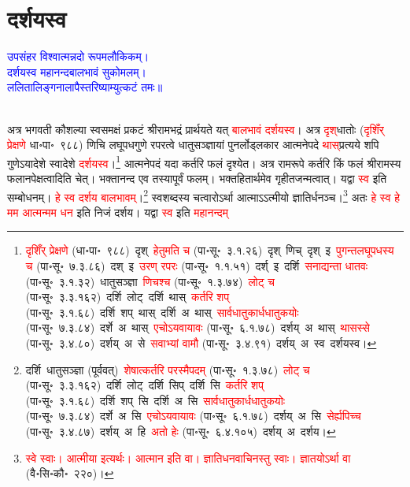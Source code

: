 \section[दर्शयस्व]{दर्शयस्व}
\centering\textcolor{blue}{उपसंहर विश्वात्मन्नदो रूपमलौकिकम्।\nopagebreak\\
दर्शयस्व महानन्दबालभावं सुकोमलम्।\nopagebreak\\
ललितालिङ्गनालापैस्तरिष्याम्युत्कटं तमः॥}\nopagebreak\\
\\
\fontsize{14}{21}\selectfont\begin{sloppypar}\justifying\noindent\hspace{10mm} अत्र भगवती कौशल्या स्व\-समक्षं प्रकटं श्रीराम\-भद्रं प्रार्थयते यत् \textcolor{red}{बाल\-भावं दर्शयस्व}। अत्र \textcolor{red}{दृश्‌}\-धातोः (\textcolor{red}{दृशिँर् प्रेक्षणे} धा॰पा॰~९८८) 
णिचि लघूपध\-गुणे रपरत्वे धातु\-सञ्ज्ञायां पुनर्लोड्लकार आत्मने\-पदे \textcolor{red}{थास्‌}\-प्रत्यये शपि गुणेऽयादेशे स्वादेशे \textcolor{red}{दर्शयस्व}।\footnote{\textcolor{red}{दृशिँर् प्रेक्षणे} (धा॰पा॰~९८८)~\arrow दृश्~\arrow \textcolor{red}{हेतुमति च} (पा॰सू॰~३.१.२६)~\arrow दृश्~णिच्~\arrow दृश्~इ~\arrow \textcolor{red}{पुगन्त\-लघूपधस्य च} (पा॰सू॰~७.३.८६)~\arrow दश्~इ~\arrow \textcolor{red}{उरण् रपरः} (पा॰सू॰~१.१.५१)~\arrow दर्श्~इ~\arrow दर्शि~\arrow \textcolor{red}{सनाद्यन्ता धातवः} (पा॰सू॰~३.१.३२)~\arrow धातुसञ्ज्ञा~\arrow \textcolor{red}{णिचश्च} (पा॰सू॰~१.३.७४)~\arrow \textcolor{red}{लोट् च} (पा॰सू॰~३.३.१६२)~\arrow दर्शि~लोट्~\arrow दर्शि~थास्~\arrow \textcolor{red}{कर्तरि शप्} (पा॰सू॰~३.१.६८)~\arrow दर्शि~शप्~थास्~\arrow दर्शि~अ~थास्~\arrow \textcolor{red}{सार्वधातुकार्धधातुकयोः} (पा॰सू॰~७.३.८४)~\arrow दर्शे~अ~थास्~\arrow \textcolor{red}{एचोऽयवायावः} (पा॰सू॰~६.१.७८)~\arrow दर्शय्~अ~थास्~\arrow \textcolor{red}{थासस्से} (पा॰सू॰~३.४.८०)~\arrow दर्शय्~अ~से~\arrow \textcolor{red}{सवाभ्यां वामौ} (पा॰सू॰~३.४.९१)~\arrow दर्शय्~अ~स्व~\arrow दर्शयस्व।} आत्मनेपदं यदा कर्तरि फलं दृश्येत। अत्र राम\-रूपे कर्तरि किं फलं श्रीरामस्य फलानपेक्षत्वादिति चेत्। भक्तानन्द एव तस्यापूर्वं फलम्। भक्त\-हितार्थमेव गृहीत\-जन्मत्वात्। यद्वा \textcolor{red}{स्व} इति सम्बोधनम्। \textcolor{red}{हे स्व दर्शय बाल\-भावम्}।\footnote{दर्शि~\arrow धातुसञ्ज्ञा (पूर्ववत्)~\arrow \textcolor{red}{शेषात्कर्तरि परस्मैपदम्} (पा॰सू॰~१.३.७८)~\arrow \textcolor{red}{लोट् च} (पा॰सू॰~३.३.१६२)~\arrow दर्शि~लोट्~\arrow दर्शि~सिप्~\arrow दर्शि~सि~\arrow \textcolor{red}{कर्तरि शप्} (पा॰सू॰~३.१.६८)~\arrow दर्शि~शप्~सि~\arrow दर्शि~अ~सि~\arrow \textcolor{red}{सार्वधातुकार्धधातुकयोः} (पा॰सू॰~७.३.८४)~\arrow दर्शे~अ~सि~\arrow \textcolor{red}{एचोऽयवायावः} (पा॰सू॰~६.१.७८)~\arrow दर्शय्~अ~सि~\arrow \textcolor{red}{सेर्ह्यपिच्च} (पा॰सू॰~३.४.८७)~\arrow दर्शय्~अ~हि~\arrow \textcolor{red}{अतो हेः} (पा॰सू॰~६.४.१०५)~\arrow दर्शय्~अ~\arrow दर्शय।} स्व\-शब्दस्य चत्वारोऽर्था आत्माऽऽत्मीयो ज्ञातिर्धनञ्च।\footnote{\textcolor{red}{स्वे स्वाः। आत्मीया इत्यर्थः। आत्मान इति वा। ज्ञाति\-धन\-वाचिनस्तु स्वाः। ज्ञातयोऽर्था वा} (वै॰सि॰कौ॰~२२०)।} अतः \textcolor{red}{हे स्व हे मम आत्मन्मम धन} इति निजं दर्शय। यद्वा \textcolor{red}{स्व} इति \textcolor{red}{महानन्दम्}

\end{sloppypar}
